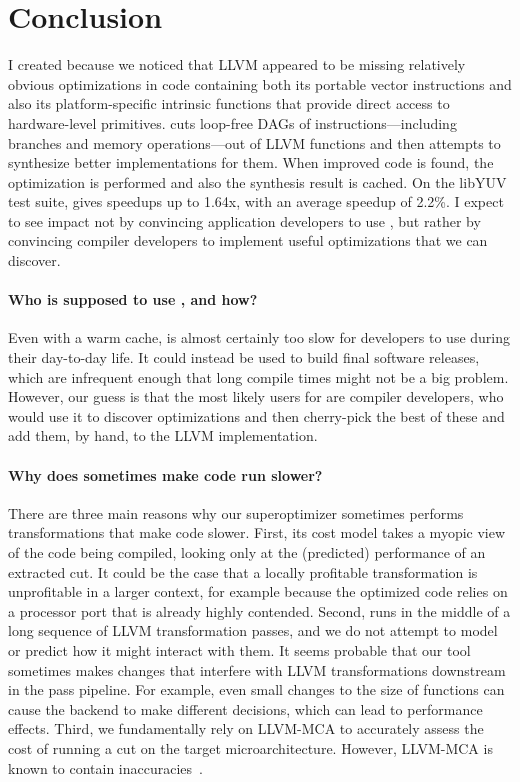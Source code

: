 \section{Conclusion}
\label{sec:conc}

I created \minotaur{} because we noticed that LLVM appeared to be missing
relatively obvious optimizations in code containing both its portable
vector instructions and also its platform-specific intrinsic
functions that provide direct access to hardware-level primitives.
%
\minotaur{} cuts loop-free DAGs of instructions---including branches and
memory operations---out of LLVM functions and then attempts to
synthesize better implementations for them.
%
When improved code is found, the optimization is performed and also
the synthesis result is cached.
%
On the libYUV test suite, \minotaur{} gives speedups up to 1.64x,
with an average speedup of 2.2\%.
%
I expect to see impact not by convincing application developers to
use \minotaur, but rather by convincing compiler developers to implement
useful optimizations that we can discover.




\iffalse
\paragraph{Who is supposed to use \minotaur{}, and how?}
%
Even with a warm cache, \minotaur{} is almost certainly too slow for
developers to use during their day-to-day life.
%
It could instead be used to build final software releases, which are
infrequent enough that long compile times might not be a big problem.
%
However, our guess is that the most likely users for \minotaur{} are
compiler developers, who would use it to discover optimizations and
then cherry-pick the best of these and add them, by hand, to the LLVM
implementation.


\paragraph{Why does \minotaur{} sometimes make code run slower?}
%
There are three main reasons why our
superoptimizer sometimes performs transformations that make code
slower.
%
First, its cost model takes a myopic view of the code being compiled,
looking only at the (predicted) performance of an extracted cut.
%
It could be the case that a locally profitable transformation is
unprofitable in a larger context, for example because the optimized
code relies on a processor port that is already highly contended.
%
Second, \minotaur{} runs in the middle of a long sequence of LLVM
transformation passes, and we do not attempt to model or predict how it
might interact with them.
%
It seems probable that our tool sometimes makes changes that interfere
with LLVM transformations downstream in the pass pipeline.
%
For example, even small changes to the size of functions can cause the
backend to make different decisions, which can lead to performance effects.
%
Third, we fundamentally rely on LLVM-MCA to accurately assess the cost
of running a cut on the target microarchitecture.
%
However, LLVM-MCA is known to contain inaccuracies~\cite{ithemal}.


